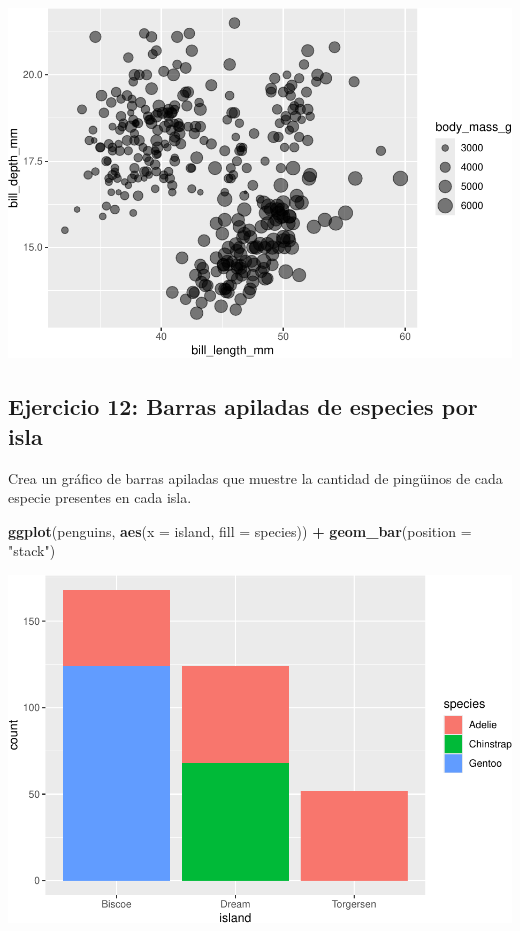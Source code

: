\documentclass[
]{book}
\newenvironment{Shaded}{\begin{snugshade}}{\end{snugshade}}
\newcommand{\AttributeTok}[1]{\textcolor[rgb]{0.13,0.29,0.53}{#1}}
\newcommand{\FunctionTok}[1]{\textcolor[rgb]{0.13,0.29,0.53}{\textbf{#1}}}
\newcommand{\NormalTok}[1]{#1}
\newcommand{\SpecialCharTok}[1]{\textcolor[rgb]{0.81,0.36,0.00}{\textbf{#1}}}
\newcommand{\StringTok}[1]{\textcolor[rgb]{0.31,0.60,0.02}{#1}}
\begin{document}
\includegraphics{bookdown-demo_files/figure-latex/unnamed-chunk-210-1.pdf}

\hypertarget{ejercicio-12-barras-apiladas-de-especies-por-isla-1}{%
\subsection{Ejercicio 12: Barras apiladas de especies por isla}\label{ejercicio-12-barras-apiladas-de-especies-por-isla-1}}

Crea un gráfico de barras apiladas que muestre la cantidad de pingüinos de cada especie presentes en cada isla.

\begin{Shaded}
\begin{Highlighting}[]
\FunctionTok{ggplot}\NormalTok{(penguins, }\FunctionTok{aes}\NormalTok{(}\AttributeTok{x =}\NormalTok{ island, }\AttributeTok{fill =}\NormalTok{ species)) }\SpecialCharTok{+}
  \FunctionTok{geom\_bar}\NormalTok{(}\AttributeTok{position =} \StringTok{"stack"}\NormalTok{)}
\end{Highlighting}
\end{Shaded}

\includegraphics{bookdown-demo_files/figure-latex/unnamed-chunk-211-1.pdf}
\end{document}
